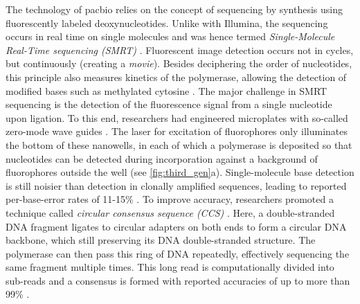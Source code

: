 The technology of \acl{pacbio} relies on the concept of sequencing by synthesis using
fluorescently labeled deoxynucleotides. Unlike with Illumina, the sequencing
occurs in real time on single molecules and was hence termed
\emph{Single-Molecule Real-Time sequencing (SMRT)} \citep{Eid2009}. Fluorescent
image detection occurs not in cycles, but continuously (creating a \emph{movie}).
Besides deciphering the order of nucleotides, this principle also measures
kinetics of the polymerase, allowing the detection of modified bases such as
methylated cytosine \citep{Flusberg2010}. The major challenge in SMRT sequencing
is the detection of the fluorescence signal from a single nucleotide upon
ligation. To this end, researchers had engineered microplates with so-called
zero-mode wave guides \citep{Uemura2010}. The laser for excitation of
fluorophores only illuminates the bottom of these nanowells, in each of which a
polymerase is deposited so that nucleotides can be detected during incorporation
against a background of fluorophores outside the well \citep{Heather2016} (see
\cref{fig:third_gen}a). Single-molecule base detection is still noisier than
detection in clonally amplified sequences, leading to reported per-base-error
rates of 11-15\% \citep{Rhoads2015}. To improve accuracy, \pacbio researchers
promoted a technique called \emph{circular consensus sequence (CCS)}
\citep{Travers2010}. Here, a double-stranded DNA fragment ligates to circular
adapters on both ends to form a circular DNA backbone, which still preserving
its DNA double-stranded structure. The polymerase can then pass this ring of DNA
repeatedly, effectively sequencing the same fragment multiple times. This long
read is computationally divided into sub-reads and a consensus is formed with
reported accuracies of up to more than 99\% \citep{Rhoads2015}.

